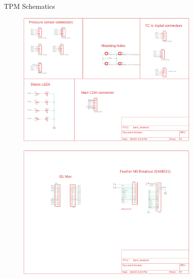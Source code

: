\documentclass[UKenglish]{beamer}
\begin{document}
\begin{frame}[allowframebreaks]{TPM Schematics}
\begin{figure}[H]
	\centering
	\includegraphics[width=0.8\textwidth]{images/tpms_breakout_schem_1}
	\label{fig:schematic-tpm-p1}
\end{figure}
\begin{figure}[H]
	\centering
	\includegraphics[width=0.8\textwidth]{images/tpms_breakout_schem_2}
	\label{fig:schematic-tpm-p2}
\end{figure}
\end{frame}
\end{document}
